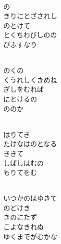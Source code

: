 \documentclass[10pt,b5j]{tarticle} %
\begin{document}
\vspace{1.5em} %
\newcommand{\linespace}{0.5em} %
\newcommand{\blocksize}{0.5\hsize} %
\newcommand{\itemmargin}{6em} %
\begin{enumerate} %
    \setlength{\itemindent}{\itemmargin} %
    \begin{minipage}[c]{\blocksize}
    
        \vspace{\linespace}
        \item~\\
        の\\
        きりにとざされし\\
        のとけて\\
        とくちわびしのの\\
        びふすなり
        
        \vspace{\linespace}
        \item~\\
        のくの\\
        くうれしくきめね\\
        ぎしをむれば\\
        にとけるの\\
        ののか
        
        \vspace{\linespace}
        \item~\\
        はりてき\\
        たけなはのとなる\\
        ききて\\
        しばしはむの\\
        もりてをむ
        
        \vspace{\linespace}
        \item~\\
        いつかのはゆきて\\
        のどけき\\
        きのにたず\\
        こよなきれぬ\\
        ゆくまでがむかな
        

\end{minipage}
\end{enumerate}
\end{document}
